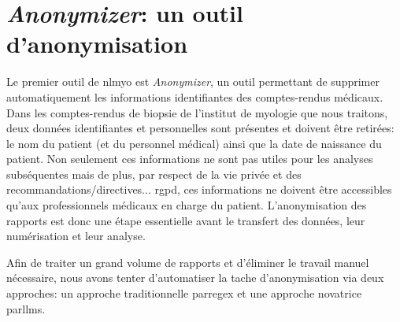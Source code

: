 \section{\textit{Anonymizer}: un outil d'anonymisation}
Le premier outil de \gls{nlmyo} est \textit{Anonymizer}, un outil permettant de supprimer automatiquement les informations identifiantes des comptes-rendus médicaux. Dans les comptes-rendus de biopsie de l'institut de myologie que nous traitons, deux données identifiantes et personnelles sont présentes et doivent être retirées: le nom du patient (et du personnel médical) ainsi que la date de naissance du patient. Non seulement ces informations ne sont pas utiles pour les analyses subséquentes mais de plus, par respect de la vie privée et des recommandations/directives... \gls{rgpd}, ces informations ne doivent être accessibles qu'aux professionnels médicaux en charge du patient. L'anonymisation des rapports est donc une étape essentielle avant le transfert des données, leur numérisation et leur analyse.

Afin de traiter un grand volume de rapports et d'éliminer le travail manuel nécessaire, nous avons tenter d'automatiser la tache d'anonymisation via deux approches: un approche traditionnelle par\gls{regex} et une approche novatrice par\gls{llms}.

